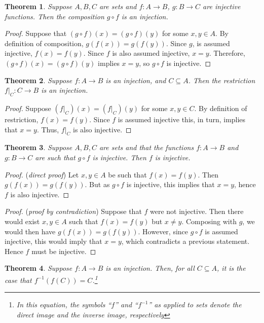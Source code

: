 \documentclass[12pt]{article}
\newtheorem{theorem}{Theorem}
\begin{document}
\begin{theorem}
Suppose $A,B,C$ are sets and $f\colon A\to B$, $g\colon B\to C$
are injective functions. Then the composition $g\circ f$ is an injection.
\end{theorem}

\begin{proof}
Suppose that $(g \circ f) (x) = (g \circ f) (y)$ for some $x, y \in A$.
By definition of composition, $g(f(x)) = g(f(y))$.  Since $g$, is 
assumed injective, $f(x) = f(y)$.  Since $f$ is also assumed injective,
$x = y$.  Therefore, $(g \circ f) (x) = (g \circ f) (y)$ implies 
$x=y$, so $g \circ f$ is injective.
\end{proof}

\begin{theorem}
Suppose $f\colon A\to B$ is an injection, and $C\subseteq A$. Then
the restriction  $f|_C \colon C\to B$ is an injection.
\end{theorem}

\begin{proof}
Suppose $(f|_C) (x) = (f|_C) (y)$ for some $x,y \in C$. By definition
of restriction, $f(x) = f(y)$.  Since $f$ is assumed injective this,
in turn, implies that $x = y$.  Thus, $f|_C$ is also injective.
\end{proof}

\begin{theorem}
Suppose $A,B,C$ are sets and that the functions $f\colon A\to B$ and 
$g\colon B\to C$ are such that $g \circ f$ is injective. Then $f$ is 
injective.
\end{theorem}

\begin{proof} ({\em direct proof})
Let $x, y \in A$ be such that $f(x) = f(y)$. Then $g(f(x)) = g(f(y))$. 
But as $g \circ f$ is injective, this implies that $x = y$, hence
$f$ is also injective.
\end{proof}

\begin{proof} ({\em proof by contradiction})
Suppose that $f$ were not injective.  Then there would exist $x,y \in A$
such that $f(x) = f(y)$ but $x \neq y$.  Composing with $g$, we would
then have $g(f(x)) = g(f(y))$.  However, since $g \circ f$ is assumed
injective, this would imply that $x = y$, which contradicts a previous
statement.  Hence $f$ must be injective.
\end{proof}

\begin{theorem}
Suppose $f\colon A\to B$ is an injection.  Then, for all $C\subseteq A$, it is the case that
$f^{-1} (f (C)) = C$.\footnote{In this equation, the symbols ``$f$'' and 
``$f^{-1}$'' as applied to sets denote the direct image and the inverse 
image, respectively}
\end{theorem}
\end{document}
